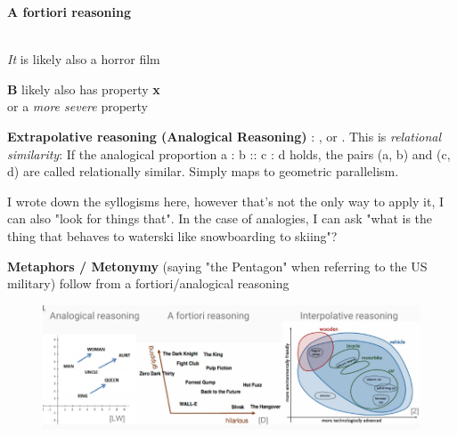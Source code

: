 \vspace{2ex}
\textbf{A fortiori reasoning}

\noindent
\begin{minipage}{.6\textwidth}
            {\phantom{penis} \\ 
            \textit{It} is likely also a horror film}
\end{minipage}%
\begin{minipage}{.4\textwidth}
               {\textbf{B} likely also has property \textbf{x} \\ 
               \vspace{-0.5em} or a \textit{more severe} property}
\end{minipage}%

\vspace{2ex}

\textbf{Extrapolative reasoning (Analogical Reasoning)} \cite{Schockaert2011}: , or . This is \textit{relational similarity}: If the analogical proportion a : b :: c : d holds, the pairs (a, b) and (c, d) are called relationally similar. Simply maps to geometric parallelism. 

I wrote down the syllogisms here, however that's not the only way to apply it, I can also "look for things that". In the case of analogies, I can ask "what is the thing that behaves to waterski like snowboarding to skiing"?

\textbf{Metaphors / Metonymy} (saying "the Pentagon" when referring to the US military) follow from a fortiori/analogical reasoning


\begin{figure}[H]
	\centering
	\includegraphics[width=\textwidth]{graphics/stolenfigures/reasoning_samples.png}
    \label{fig:graphic_reasoning}
\end{figure}

